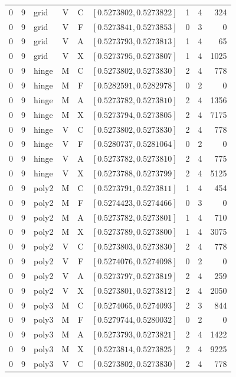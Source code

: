 \begin{longtable}{r r l c c l r r r}
0 & 9 & grid & V & C & $[0.5273802,0.5273822]$ & 1 & 4 & 324 \\
0 & 9 & grid & V & F & $[0.5273841,0.5273853]$ & 0 & 3 & 0 \\
0 & 9 & grid & V & A & $[0.5273793,0.5273813]$ & 1 & 4 & 65 \\
0 & 9 & grid & V & X & $[0.5273795,0.5273807]$ & 1 & 4 & 1025 \\
0 & 9 & hinge & M & C & $[0.5273802,0.5273830]$ & 2 & 4 & 778 \\
0 & 9 & hinge & M & F & $[0.5282591,0.5282978]$ & 0 & 2 & 0 \\
0 & 9 & hinge & M & A & $[0.5273782,0.5273810]$ & 2 & 4 & 1356 \\
0 & 9 & hinge & M & X & $[0.5273794,0.5273805]$ & 2 & 4 & 7175 \\
0 & 9 & hinge & V & C & $[0.5273802,0.5273830]$ & 2 & 4 & 778 \\
0 & 9 & hinge & V & F & $[0.5280737,0.5281064]$ & 0 & 2 & 0 \\
0 & 9 & hinge & V & A & $[0.5273782,0.5273810]$ & 2 & 4 & 775 \\
0 & 9 & hinge & V & X & $[0.5273788,0.5273799]$ & 2 & 4 & 5125 \\
0 & 9 & poly2 & M & C & $[0.5273791,0.5273811]$ & 1 & 4 & 454 \\
0 & 9 & poly2 & M & F & $[0.5274423,0.5274466]$ & 0 & 3 & 0 \\
0 & 9 & poly2 & M & A & $[0.5273782,0.5273801]$ & 1 & 4 & 710 \\
0 & 9 & poly2 & M & X & $[0.5273789,0.5273800]$ & 1 & 4 & 3075 \\
0 & 9 & poly2 & V & C & $[0.5273803,0.5273830]$ & 2 & 4 & 778 \\
0 & 9 & poly2 & V & F & $[0.5274076,0.5274098]$ & 0 & 2 & 0 \\
0 & 9 & poly2 & V & A & $[0.5273797,0.5273819]$ & 2 & 4 & 259 \\
0 & 9 & poly2 & V & X & $[0.5273801,0.5273812]$ & 2 & 4 & 2050 \\
0 & 9 & poly3 & M & C & $[0.5274065,0.5274093]$ & 2 & 3 & 844 \\
0 & 9 & poly3 & M & F & $[0.5279744,0.5280032]$ & 0 & 2 & 0 \\
0 & 9 & poly3 & M & A & $[0.5273793,0.5273821]$ & 2 & 4 & 1422 \\
0 & 9 & poly3 & M & X & $[0.5273814,0.5273825]$ & 2 & 4 & 9225 \\
0 & 9 & poly3 & V & C & $[0.5273802,0.5273830]$ & 2 & 4 & 778 \\

\end{longtable}
